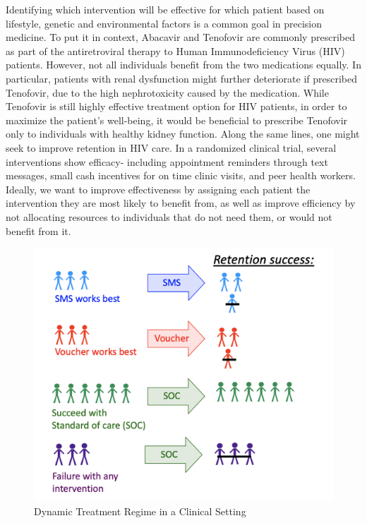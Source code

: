 \documentclass[12pt, krantz2,]{krantz}
\theoremstyle{definition}
\theoremstyle{definition}
\theoremstyle{definition}
\newcommand{\1}{\mathbbm{1}}
\begin{document}
Identifying which intervention will be effective for which patient based on
lifestyle, genetic and environmental factors is a common goal in precision
medicine. To put it in context, Abacavir and Tenofovir are commonly prescribed
as part of the antiretroviral therapy to Human Immunodeficiency Virus (HIV)
patients. However, not all individuals benefit from the two medications equally.
In particular, patients with renal dysfunction might further deteriorate if
prescribed Tenofovir, due to the high nephrotoxicity caused by the medication.
While Tenofovir is still highly effective treatment option for HIV patients, in
order to maximize the patient's well-being, it would be beneficial to prescribe
Tenofovir only to individuals with healthy kidney function. Along the same
lines, one might seek to improve retention in HIV care. In a randomized clinical
trial, several interventions show efficacy- including appointment reminders
through text messages, small cash incentives for on time clinic visits, and peer
health workers. Ideally, we want to improve effectiveness by assigning each
patient the intervention they are most likely to benefit from, as well as
improve efficiency by not allocating resources to individuals that do not need
them, or would not benefit from it.

\begin{figure}

{\centering \includegraphics[width=0.8\linewidth]{img/png/DynamicA_Illustration} 

}

\caption{Dynamic Treatment Regime in a Clinical Setting}\label{fig:unnamed-chunk-1}
\end{figure}
\end{document}
